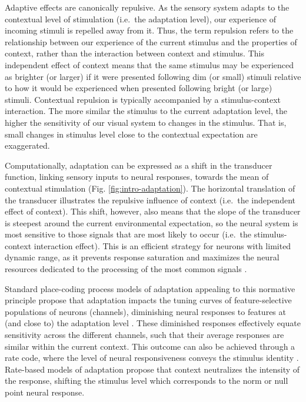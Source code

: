 \documentclass[a4paper, nobind]{templates/ociamthesis}
\begin{document}
Adaptive effects are canonically repulsive. As the sensory system adapts to the contextual level of stimulation (i.e.~the adaptation level), our experience of incoming stimuli is repelled away from it. Thus, the term repulsion refers to the relationship between our experience of the current stimulus and the properties of context, rather than the interaction between context and stimulus. This independent effect of context means that the same stimulus may be experienced as brighter (or larger) if it were presented following dim (or small) stimuli relative to how it would be experienced when presented following bright (or large) stimuli. Contextual repulsion is typically accompanied by a stimulus-context interaction. The more similar the stimulus to the current adaptation level, the higher the sensitivity of our visual system to changes in the stimulus. That is, small changes in stimulus level close to the contextual expectation are exaggerated.

Computationally, adaptation can be expressed as a shift in the transducer function, linking sensory inputs to neural responses, towards the mean of contextual stimulation (Fig. \ref{fig:intro-adaptation}). The horizontal translation of the transducer illustrates the repulsive influence of context (i.e.~the independent effect of context). This shift, however, also means that the slope of the transducer is steepest around the current environmental expectation, so the neural system is most sensitive to those signals that are most likely to occur (i.e.~the stimulus-context interaction effect). This is an efficient strategy for neurons with limited dynamic range, as it prevents response saturation and maximizes the neural resources dedicated to the processing of the most common signals \autocite{carandini2012}.

Standard place-coding process models of adaptation appealing to this normative principle propose that adaptation impacts the tuning curves of feature-selective populations of neurons (channels), diminishing neural responses to features at (and close to) the adaptation level \autocite[e.g.~for perceptual properties including color contrast, spatial frequency or viewpoint,][]{webster2011}. These diminished responses effectively equate sensitivity across the different channels, such that their average responses are similar within the current context. This outcome can also be achieved through a rate code, where the level of neural responsiveness conveys the stimulus identity \autocite[e.g.~for perceptual properties including saturation, blurriness or facial distortion,][]{webster2011}. Rate-based models of adaptation propose that context neutralizes the intensity of the response, shifting the stimulus level which corresponds to the norm or null point neural response.
\end{document}
